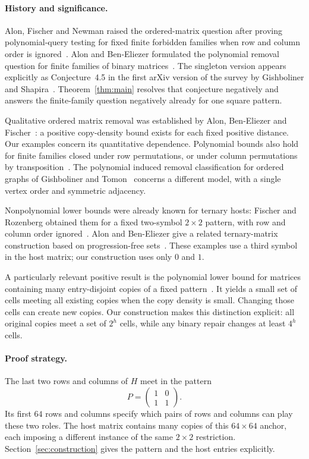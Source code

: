 \paragraph{History and significance.}
Alon, Fischer and Newman raised the ordered-matrix question after proving
polynomial-query testing for fixed finite forbidden families when row
and column order is ignored~\cite[Section~7]{AlonFischerNewman2007}.
Alon and Ben-Eliezer formulated the polynomial removal question for
finite families of binary matrices~\cite[Problem~1.4]{AlonBenEliezer2020}.
The singleton version appears explicitly as
Conjecture~4.5 in the first arXiv version of the survey by Gishboliner and
Shapira~\cite{GishbolinerShapira2025}.
Theorem~\ref{thm:main} resolves that conjecture negatively and answers
the finite-family question negatively already for one square pattern.

Qualitative ordered matrix removal was established by Alon,
Ben-Eliezer and Fischer~\cite[Theorem~1.8 in the full
version]{AlonBenEliezerFischer2017}: a positive copy-density bound exists
for each fixed positive distance. Our examples concern its quantitative
dependence. Polynomial bounds also hold for finite families closed under
row permutations, or under column permutations by
transposition~\cite[Theorem~1.5]{AlonBenEliezer2020}.
The polynomial induced removal classification for ordered graphs of Gishboliner
and Tomon~\cite[Theorem~1.1]{GishbolinerTomon2022} concerns a
different model, with a single vertex order and symmetric adjacency.

Nonpolynomial lower bounds were already known for ternary hosts:
Fischer and Rozenberg obtained them for a fixed two-symbol $2\times2$
pattern, with row and column order ignored~\cite{FischerRozenberg2007}.
Alon and Ben-Eliezer give a related
ternary-matrix construction based on progression-free
sets~\cite[Section~5.1]{AlonBenEliezer2020}. These examples use a third
symbol in the host matrix; our construction uses only $0$ and $1$.

A particularly relevant positive result is the polynomial lower bound
for matrices containing many entry-disjoint copies of a fixed
pattern~\cite[Theorem~1.2]{AlonBenEliezer2020}. It yields a small set of
cells meeting all existing copies when the copy density is small.
Changing those cells can create new copies. Our construction makes
this distinction explicit: all original copies meet a set of $2^h$
cells, while any binary repair changes at least $4^h$ cells.

\paragraph{Proof strategy.}
The last two rows and columns of $H$ meet in the pattern
\[
 P=\begin{pmatrix}1&0\\1&1\end{pmatrix}.
\]
Its first $64$ rows and columns specify which pairs of rows and columns
can play these two roles. The host matrix contains many copies of this
$64\times64$ anchor, each imposing a different instance of the same
$2\times2$ restriction. Section~\ref{sec:construction} gives the pattern
and the host entries explicitly.

